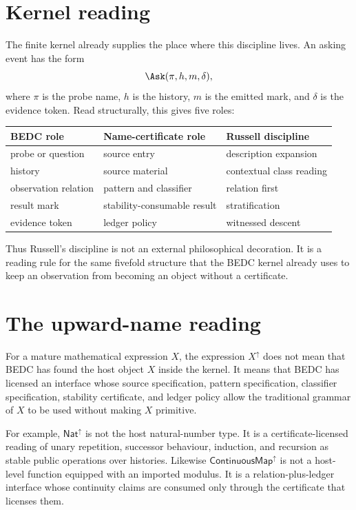 \section{Kernel reading}
\label{sec:russell-problem-kernel-reading}

The finite kernel already supplies the place where this discipline lives. An asking event has the form
$$
\Ask(\pi,h,m,\delta),
$$
where $\pi$ is the probe name, $h$ is the history, $m$ is the emitted mark, and $\delta$ is the evidence token. Read structurally, this gives five roles:

\begin{center}
\begin{tabular}{lll}
\textbf{BEDC role} & \textbf{Name-certificate role} & \textbf{Russell discipline} \\
\hline
probe or question & source entry & description expansion \\
history & source material & contextual class reading \\
observation relation & pattern and classifier & relation first \\
result mark & stability-consumable result & stratification \\
evidence token & ledger policy & witnessed descent \\
\end{tabular}
\end{center}

Thus Russell's discipline is not an external philosophical decoration. It is a reading rule for the same fivefold structure that the BEDC kernel already uses to keep an observation from becoming an object without a certificate.

\section{The upward-name reading}
\label{sec:russell-problem-xup-reading}

For a mature mathematical expression $X$, the expression $X^{\uparrow}$ does not mean that BEDC has found the host object $X$ inside the kernel. It means that BEDC has licensed an interface whose source specification, pattern specification, classifier specification, stability certificate, and ledger policy allow the traditional grammar of $X$ to be used without making $X$ primitive.

For example, $\mathsf{Nat}^{\uparrow}$ is not the host natural-number type. It is a certificate-licensed reading of unary repetition, successor behaviour, induction, and recursion as stable public operations over histories. Likewise $\mathsf{ContinuousMap}^{\uparrow}$ is not a host-level function equipped with an imported modulus. It is a relation-plus-ledger interface whose continuity claims are consumed only through the certificate that licenses them.

